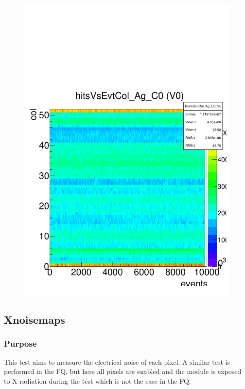 \documentclass[a4paper,12pt,twoside]{article}
\begin{document}
\begin{figure} [h!]
\begin{minipage}{.48\textwidth}
  \includegraphics[width=\textwidth]{./HRData_HitsEventColumn.pdf}
  \label{HRData-HitsEventColumn}
\end{minipage}
\end{figure}


\subsection{Xnoisemaps}
\subsubsection{Purpose}
This test aims to measure the electrical noise of each pixel. A similar test is performed in the FQ, but here all pixels are enabled and the module is exposed to X-radiation during the test which is not the case in the FQ.
\end{document}
